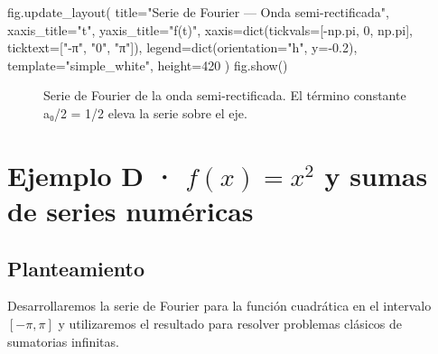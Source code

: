 \documentclass[
  letterpaper,
  DIV=11,
  numbers=noendperiod]{scrreprt}
\newenvironment{Shaded}{\begin{snugshade}}{\end{snugshade}}
\newcommand{\BuiltInTok}[1]{\textcolor[rgb]{0.00,0.23,0.31}{#1}}
\newcommand{\DecValTok}[1]{\textcolor[rgb]{0.68,0.00,0.00}{#1}}
\newcommand{\FloatTok}[1]{\textcolor[rgb]{0.68,0.00,0.00}{#1}}
\newcommand{\NormalTok}[1]{\textcolor[rgb]{0.00,0.23,0.31}{#1}}
\newcommand{\OperatorTok}[1]{\textcolor[rgb]{0.37,0.37,0.37}{#1}}
\newcommand{\StringTok}[1]{\textcolor[rgb]{0.13,0.47,0.30}{#1}}
\begin{document}
\begin{Shaded}
\begin{Highlighting}[]
\NormalTok{fig.update\_layout(}
\NormalTok{    title}\OperatorTok{=}\StringTok{"Serie de Fourier — Onda semi{-}rectificada"}\NormalTok{,}
\NormalTok{    xaxis\_title}\OperatorTok{=}\StringTok{"t"}\NormalTok{,}
\NormalTok{    yaxis\_title}\OperatorTok{=}\StringTok{"f(t)"}\NormalTok{,}
\NormalTok{    xaxis}\OperatorTok{=}\BuiltInTok{dict}\NormalTok{(tickvals}\OperatorTok{=}\NormalTok{[}\OperatorTok{{-}}\NormalTok{np.pi, }\DecValTok{0}\NormalTok{, np.pi],}
\NormalTok{               ticktext}\OperatorTok{=}\NormalTok{[}\StringTok{"{-}π"}\NormalTok{, }\StringTok{"0"}\NormalTok{, }\StringTok{"π"}\NormalTok{]),}
\NormalTok{    legend}\OperatorTok{=}\BuiltInTok{dict}\NormalTok{(orientation}\OperatorTok{=}\StringTok{"h"}\NormalTok{, y}\OperatorTok{={-}}\FloatTok{0.2}\NormalTok{),}
\NormalTok{    template}\OperatorTok{=}\StringTok{"simple\_white"}\NormalTok{,}
\NormalTok{    height}\OperatorTok{=}\DecValTok{420}
\NormalTok{)}
\NormalTok{fig.show()}
\end{Highlighting}
\end{Shaded}

\begin{figure}


\caption{\label{fig-ej-c}Serie de Fourier de la onda semi-rectificada.
El término constante a₀/2 = 1/2 eleva la serie sobre el eje.}

\end{figure}%

\section{\texorpdfstring{Ejemplo D · \(f(x) = x^2\) y sumas de series
numéricas}{Ejemplo D · f(x) = x\^{}2 y sumas de series numéricas}}\label{sec-ej-d}

\subsection{Planteamiento}\label{planteamiento-7}

Desarrollaremos la serie de Fourier para la función cuadrática en el
intervalo \([-\pi, \pi]\) y utilizaremos el resultado para resolver
problemas clásicos de sumatorias infinitas.
\end{document}
